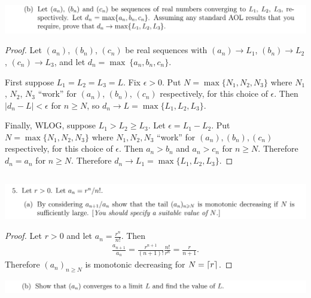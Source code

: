 \documentclass[12pt]{article}
\begin{document}
\begin{mdframed}
\includegraphics[width=400pt]{img/oxford-M2-analysis-I-4-4-b.png}
\end{mdframed}
\begin{proof}
  Let $(a_n)$, $(b_n)$, $(c_n)$ be real sequences with $(a_n) \to L_1$, $(b_n) \to L_2$,
  $(c_n) \to L_3$, and let $d_n = \max ~ \{a_n, b_n, c_n\}$.

  First suppose $L_1 = L_2 = L_3 = L$. Fix $\epsilon > 0$. Put $N = \max\{N_1, N_2, N_3\}$ where
  $N_1$, $N_2$, $N_3$ ``work'' for $(a_n)$, $(b_n)$, $(c_n)$ respectively, for this choice of
  $\epsilon$. Then $|d_n - L| < \epsilon$ for $n \geq N$, so $d_n \to L = \max\{L_1, L_2, L_3\}$.

  Finally, WLOG, suppose $L_1 > L_2 \geq L_3$. Let $\epsilon = L_1 - L_2$. Put
  $N = \max\{N_1, N_2, N_3\}$ where $N_1, N_2, N_3$ ``work'' for $(a_n), (b_n), (c_n)$
  respectively, for this choice of $\epsilon$. Then $a_n > b_n$ and $a_n > c_n$ for $n \geq
  N$. Therefore $d_n = a_n$ for $n \geq N$. Therefore $d_n \to L_1 = \max\{L_1, L_2, L_3\}$.

\end{proof}


\newpage
\subsection{}
\begin{mdframed}
  \includegraphics[width=400pt]{img/oxford-M2-analysis-I-4-5-a.png}
\end{mdframed}

\begin{proof}
  Let $r > 0$ and let $a_n = \frac{r^n}{n!}$. Then
  \begin{align*}
    \frac{a_{n+1}}{a_n} = \frac{r^{n+1}}{(n+1)!}\frac{n!}{r^n} = \frac{r}{n+1}.
  \end{align*}
  Therefore $(a_n)_{n \geq N}$ is monotonic decreasing for $N = \lceil r\rceil$.
\end{proof}

\begin{mdframed}
  \includegraphics[width=400pt]{img/oxford-M2-analysis-I-4-5-b.png}
\end{mdframed}
\end{document}
